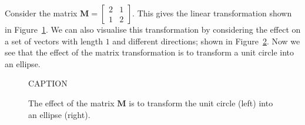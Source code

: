 \documentclass[a4paper]{article}
\newcommand{\bvec}[1]{\boldsymbol{\mathbf{#1}}}
\begin{document}
Consider the matrix $\bvec{M}=\begin{bmatrix}2&1\\1&2\end{bmatrix}$. This gives the linear transformation shown in Figure~\ref{fig:matrix_transformation}. We can also visualise this transformation by considering the effect on a set of vectors with length $1$ and different directions; shown in Figure~\ref{fig:matrix_transformation_unit_circle}. Now we see that the effect of the matrix transformation is to transform a unit circle into an ellipse.
\begin{figure}[tb]
  \centering
    \caption{\label{fig:matrix_transformation}CAPTION}
\end{figure}

\begin{figure}[tb]
  \centering
    \caption{\label{fig:matrix_transformation_unit_circle}The effect of the matrix $\bvec{M}$ is to transform the unit circle (left) into an ellipse (right).}
\end{figure}
\end{document}
